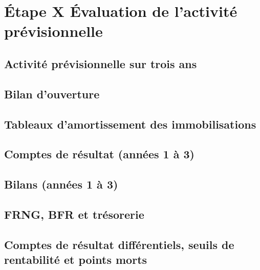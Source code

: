 \section{Étape X \textendash{} Évaluation de l'activité prévisionnelle}

\subsection{Activité prévisionnelle sur trois ans}
\subsection{Bilan d'ouverture}
\subsection{Tableaux d'amortissement des immobilisations}
\subsection{Comptes de résultat (années 1 à 3)}
\subsection{Bilans (années 1 à 3)}
\subsection{FRNG, BFR et trésorerie}
\subsection{Comptes de résultat différentiels, seuils de rentabilité et points morts}
